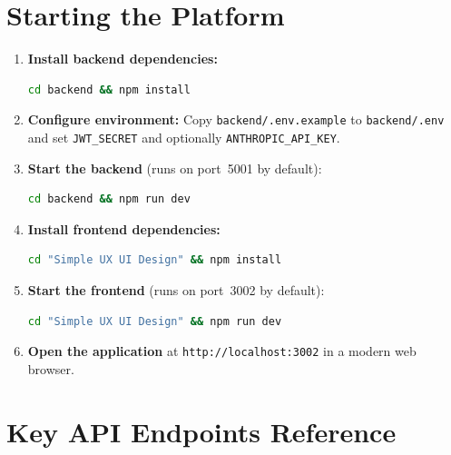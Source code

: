 \section{Starting the Platform}

\begin{enumerate}
  \item \textbf{Install backend dependencies:}
\begin{lstlisting}[language=bash]
cd backend && npm install
\end{lstlisting}

  \item \textbf{Configure environment:} Copy \texttt{backend/.env.example}
  to \texttt{backend/.env} and set \texttt{JWT\_SECRET} and optionally
  \texttt{ANTHROPIC\_API\_KEY}.

  \item \textbf{Start the backend} (runs on port~5001 by default):
\begin{lstlisting}[language=bash]
cd backend && npm run dev
\end{lstlisting}

  \item \textbf{Install frontend dependencies:}
\begin{lstlisting}[language=bash]
cd "Simple UX UI Design" && npm install
\end{lstlisting}

  \item \textbf{Start the frontend} (runs on port~3002 by default):
\begin{lstlisting}[language=bash]
cd "Simple UX UI Design" && npm run dev
\end{lstlisting}

  \item \textbf{Open the application} at
  \texttt{http://localhost:3002} in a modern web browser.
\end{enumerate}

\section{Key API Endpoints Reference}

